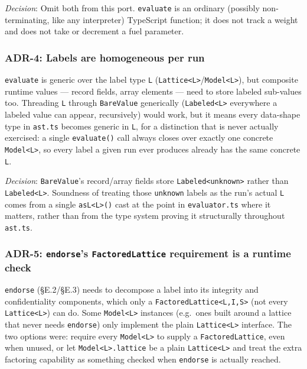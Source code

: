 \documentclass[11pt, a4paper]{article}
\begin{document}
\emph{Decision}: Omit both from this port. \texttt{evaluate} is an ordinary
(possibly non-terminating, like any interpreter) TypeScript function; it does
not track a weight and does not take or decrement a fuel parameter.


\subsubsection{ADR-4: Labels are homogeneous per run}

\texttt{evaluate} is generic over the label type \texttt{L}
(\texttt{Lattice<L>}/\texttt{Model<L>}), but composite runtime values ---
record fields, array elements --- need to store labeled sub-values too.
Threading \texttt{L} through \texttt{BareValue} generically
(\texttt{Labeled<L>} everywhere a labeled value can appear, recursively) would
work, but it means every data-shape type in \texttt{ast.ts} becomes generic in
\texttt{L}, for a distinction that is never actually exercised: a single
\texttt{evaluate()} call always closes over exactly one concrete
\texttt{Model<L>}, so every label a given run ever produces already has the
same concrete \texttt{L}.

\emph{Decision}: \texttt{BareValue}'s record/array fields store
\texttt{Labeled<unknown>} rather than \texttt{Labeled<L>}. Soundness of
treating those \texttt{unknown} labels as the run's actual \texttt{L} comes
from a single \texttt{asL<L>()} cast at the point in \texttt{evaluator.ts}
where it matters, rather than from the type system proving it structurally
throughout \texttt{ast.ts}.


\subsubsection{ADR-5: \texttt{endorse}'s \texttt{FactoredLattice} requirement
is a runtime check}

\texttt{endorse} (§E.2/§E.3) needs to decompose a label into its integrity and
confidentiality components, which only a \texttt{FactoredLattice<L,I,S>} (not
every \texttt{Lattice<L>}) can do. Some \texttt{Model<L>} instances (e.g.\ ones
built around a lattice that never needs \texttt{endorse}) only implement the
plain \texttt{Lattice<L>} interface. The two options were: require every
\texttt{Model<L>} to supply a \texttt{FactoredLattice}, even when unused, or
let \texttt{Model<L>.lattice} be a plain \texttt{Lattice<L>} and treat the
extra factoring capability as something checked when \texttt{endorse} is
actually reached.
\end{document}
